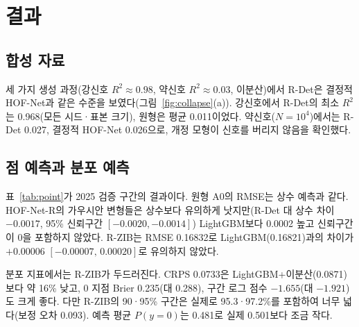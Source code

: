 \documentclass[journal,a4paper,10pt]{IEEEtran}
\begin{document}
\section{결과}
\label{sec:results}

\subsection{합성 자료}
세 가지 생성 과정(강신호 $R^2\approx0.98$, 약신호 $R^2\approx0.03$, 이분산)에서 R-Det은 결정적 HOF-Net과 같은 수준을 보였다(그림~\ref{fig:collapse}(a)). 강신호에서 R-Det의 최소 $R^2$는 0.968(모든 시드·표본 크기), 원형은 평균 0.011이었다. 약신호($N=10^4$)에서는 R-Det 0.027, 결정적 HOF-Net 0.026으로, 개정 모형이 신호를 버리지 않음을 확인했다.

\subsection{점 예측과 분포 예측}
표~\ref{tab:point}가 2025 검증 구간의 결과이다. 원형 A0의 RMSE는 상수 예측과 같다. HOF-Net-R의 가우시안 변형들은 상수보다 유의하게 낫지만(R-Det 대 상수 차이 $-0.0017$, 95\% 신뢰구간 $[-0.0020,-0.0014]$) LightGBM보다 0.0002 높고 신뢰구간이 0을 포함하지 않았다. R-ZIB는 RMSE 0.16832로 LightGBM(0.16821)과의 차이가 $+0.00006$ $[-0.00007,\,0.00020]$로 유의하지 않았다.

분포 지표에서는 R-ZIB가 두드러진다. CRPS 0.0733은 LightGBM+이분산(0.0871)보다 약 16\% 낮고, 0 지점 Brier 0.235(대 0.288), 구간 로그 점수 $-1.655$(대 $-1.921$)도 크게 좋다. 다만 R-ZIB의 90·95\% 구간은 실제로 95.3·97.2\%를 포함하여 너무 넓다(보정 오차 0.093). 예측 평균 $P(y=0)$는 0.481로 실제 0.501보다 조금 작다.
\end{document}
